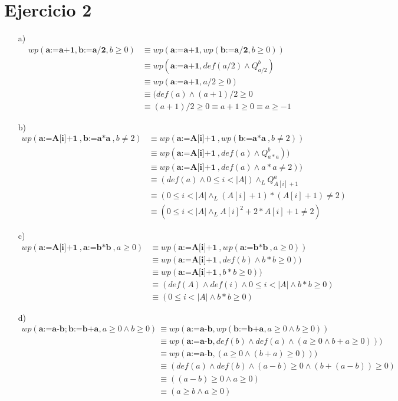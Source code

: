 \documentclass{article}
\begin{document}
\section*{Ejercicio 2}
\large{\begin{itemize}
    \item [a) ] 
    \begin{align}
    wp(\textbf{a:=a+1},\textbf{b:=a/2},b\geq0)&\equiv wp(\textbf{a:=a+1},wp(\textbf{b:=a/2},b\geq0))\\
    &\equiv wp(\textbf{a:=a+1},def(a/2)\land Q^{b}_{a/2})\\
    &\equiv wp(\textbf{a:=a+1},a/2\geq0)\\
    &\equiv (def(a) \land (a+1)/2\geq0\\
    &\equiv (a+1)/2\geq0\equiv a+1\geq0\equiv a\geq-1
    \end{align}
    \item [b) ] 
    \setcounter{equation}{0}
    \begin{align}
        wp(\textbf{a:=A[i]+1}\ ,\textbf{b:=a*a}\ ,b\neq2)&\equiv wp(\textbf{a:=A[i]+1}\ ,wp(\textbf{b:=a*a}\ ,b\neq2))\\
        &\equiv wp(\textbf{a:=A[i]+1}\ ,def(a) \land Q^b_{a*a}))\\
        &\equiv wp(\textbf{a:=A[i]+1}\ ,def(a) \land a*a\neq2))\\
        &\equiv (def(a) \land 0\leq i<|A|) \land_L Q^a_{A[i]+1}\\
        &\equiv (0\leq i<|A| \land_L (A[i]+1)*(A[i]+1)\neq2)\\
        &\equiv (0\leq i<|A| \land_L A[i]^2+2*A[i]+1\neq2)
    \end{align}
    \item [c) ] 
    \setcounter{equation}{0}
    \begin{align}
        wp(\textbf{a:=A[i]+1}\ ,\textbf{a:=b*b}\ ,a\geq0)&\equiv wp(\textbf{a:=A[i]+1}\ ,wp(\textbf{a:=b*b}\ ,a\geq0))\\
        &\equiv wp(\textbf{a:=A[i]+1}\ ,def(b) \land b*b\geq0))\\
        &\equiv wp(\textbf{a:=A[i]+1}\ ,b*b\geq0))\\
        &\equiv (def(A) \land def(i) \land 0\leq i<|A| \land b*b\geq0)\\
        &\equiv (0\leq i<|A| \land b*b\geq0)
    \end{align}
    \item [d) ]
    \setcounter{equation}{0}\normalsize{
    \begin{align}
        wp(\textbf{a:=a-b};\textbf{b:=b+a},a\geq0 \land b\geq0)&\equiv wp(\textbf{a:=a-b}, wp(\textbf{b:=b+a},a\geq0 \land b\geq0))\\
        &\equiv wp(\textbf{a:=a-b}, def(b) \land def(a) \land (a\geq0 \land b+a\geq0)))\\
        &\equiv wp(\textbf{a:=a-b}, (a\geq0 \land (b+a)\geq0)))\\
        &\equiv (def(a) \land def(b) \land (a-b)\geq0 \land (b+(a-b))\geq0)\\
        &\equiv ((a-b)\geq0 \land a\geq0)\\
        &\equiv (a\geq b \land a\geq0)
    \end{align}}
\end{itemize}}
\end{document}
